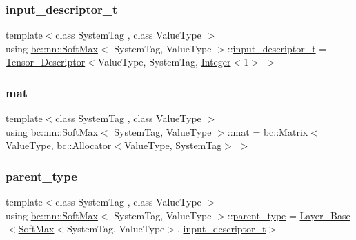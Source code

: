 \subsubsection{\texorpdfstring{input\+\_\+descriptor\+\_\+t}{input\_descriptor\_t}}
{\footnotesize\ttfamily template$<$class System\+Tag , class Value\+Type $>$ \\
using \hyperlink{structbc_1_1nn_1_1SoftMax}{bc\+::nn\+::\+Soft\+Max}$<$ System\+Tag, Value\+Type $>$\+::\hyperlink{structbc_1_1nn_1_1SoftMax_acb201cfe27da9360a1b121e7d9ab190a}{input\+\_\+descriptor\+\_\+t} =  \hyperlink{structbc_1_1nn_1_1Tensor__Descriptor}{Tensor\+\_\+\+Descriptor}$<$Value\+Type, System\+Tag, \hyperlink{structbc_1_1traits_1_1Integer}{Integer}$<$1$>$ $>$}

\mbox{\label{structbc_1_1nn_1_1SoftMax_ae3dde4631e85a7be9c8578e70f642dd5}} 
\subsubsection{\texorpdfstring{mat}{mat}}
{\footnotesize\ttfamily template$<$class System\+Tag , class Value\+Type $>$ \\
using \hyperlink{structbc_1_1nn_1_1SoftMax}{bc\+::nn\+::\+Soft\+Max}$<$ System\+Tag, Value\+Type $>$\+::\hyperlink{structbc_1_1nn_1_1SoftMax_ae3dde4631e85a7be9c8578e70f642dd5}{mat} =  \hyperlink{namespacebc_a92dd1e243183b382432a5fac3ed8b89f}{bc\+::\+Matrix}$<$Value\+Type, \hyperlink{classbc_1_1allocators_1_1Allocator}{bc\+::\+Allocator}$<$Value\+Type, System\+Tag$>$ $>$}

\mbox{\label{structbc_1_1nn_1_1SoftMax_afebb15c21a42f0eb4bb355c726a5a0d5}} 
\subsubsection{\texorpdfstring{parent\+\_\+type}{parent\_type}}
{\footnotesize\ttfamily template$<$class System\+Tag , class Value\+Type $>$ \\
using \hyperlink{structbc_1_1nn_1_1SoftMax}{bc\+::nn\+::\+Soft\+Max}$<$ System\+Tag, Value\+Type $>$\+::\hyperlink{structbc_1_1nn_1_1SoftMax_afebb15c21a42f0eb4bb355c726a5a0d5}{parent\+\_\+type} =  \hyperlink{structbc_1_1nn_1_1Layer__Base}{Layer\+\_\+\+Base}$<$\hyperlink{structbc_1_1nn_1_1SoftMax}{Soft\+Max}$<$System\+Tag, Value\+Type$>$, \hyperlink{structbc_1_1nn_1_1SoftMax_acb201cfe27da9360a1b121e7d9ab190a}{input\+\_\+descriptor\+\_\+t}$>$}

